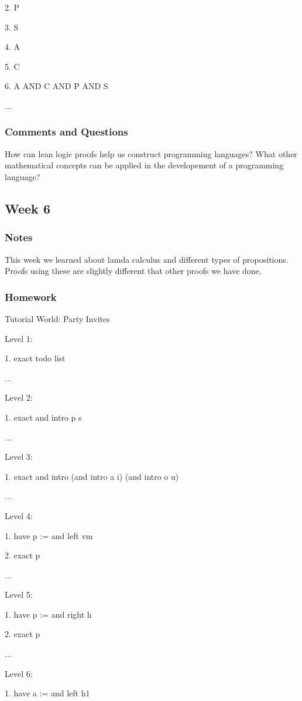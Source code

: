\documentclass{article}
\theoremstyle{theorem}
\theoremstyle{definition}
\theoremstyle{remark}
\begin{document}
2. P

3. S

4. A

5. C

6. A AND C AND P AND S

...

\subsubsection*{Comments and Questions}

How can lean logic proofs help us construct programming languages? What other mathematical concepts can be applied in the developement of a programming language?


\subsection{Week 6}

\subsubsection*{Notes}
This week we learned about lamda calculus and different types of propositions. Proofs using these are slightly different that other proofs we have done. 

\subsubsection*{Homework}
Tutorial World: Party Invites

Level 1:

1. exact todo list

...

Level 2:

1. exact and intro p s

...

Level 3:

1. exact and intro (and intro a i) (and intro o u)

... 

Level 4:

1. have p := and left vm

2. exact p

... 

Level 5:

1. have p := and right h

2. exact p

... 

Level 6:

1. have a := and left h1
\end{document}
